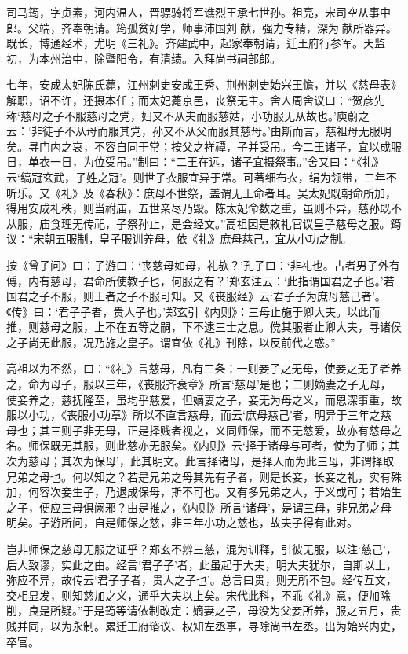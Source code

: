 \documentclass[12pt,UTF8]{ctexbook}
\begin{document}
司马筠，字贞素，河内温人，晋骠骑将军谯烈王承七世孙。祖亮，宋司空从事中郎。父端，齐奉朝请。筠孤贫好学，师事沛国刘献，强力专精，深为献所器异。既长，博通经术，尤明《三礼》。齐建武中，起家奉朝请，迁王府行参军。天监初，为本州治中，除暨阳令，有清绩。入拜尚书祠部郎。

七年，安成太妃陈氏薨，江州刺史安成王秀、荆州刺史始兴王憺，并以《慈母表》解职，诏不许，还摄本任；而太妃薨京邑，丧祭无主。舍人周舍议曰：“贺彦先称‘慈母之子不服慈母之党，妇又不从夫而服慈姑，小功服无从故也。’庾蔚之云：‘非徒子不从母而服其党，孙又不从父而服其慈母。’由斯而言，慈祖母无服明矣。寻门内之哀，不容自同于常；按父之祥禫，子并受吊。今二王诸子，宜以成服日，单衣一日，为位受吊。”制曰：“二王在远，诸子宜摄祭事。”舍又曰：“《礼》云‘缟冠玄武，子姓之冠’。则世子衣服宜异于常。可著细布衣，绢为领带，三年不听乐。又《礼》及《春秋》：庶母不世祭，盖谓无王命者耳。吴太妃既朝命所加，得用安成礼秩，则当祔庙，五世亲尽乃毁。陈太妃命数之重，虽则不异，慈孙既不从服，庙食理无传祀，子祭孙止，是会经文。”高祖因是敕礼官议皇子慈母之服。筠议：“宋朝五服制，皇子服训养母，依《礼》庶母慈己，宜从小功之制。

按《曾子问》曰：子游曰：‘丧慈母如母，礼欤？’孔子曰：‘非礼也。古者男子外有傅，内有慈母，君命所使教子也，何服之有？’郑玄注云：‘此指谓国君之子也。’若国君之子不服，则王者之子不服可知。又《丧服经》云‘君子子为庶母慈己者’。《传》曰：‘君子子者，贵人子也。’郑玄引《内则》：三母止施于卿大夫。以此而推，则慈母之服，上不在五等之嗣，下不逮三士之息。傥其服者止卿大夫，寻诸侯之子尚无此服，况乃施之皇子。谓宜依《礼》刊除，以反前代之惑。”

高祖以为不然，曰：“《礼》言慈母，凡有三条：一则妾子之无母，使妾之无子者养之，命为母子，服以三年，《丧服齐衰章》所言‘慈母’是也；二则嫡妻之子无母，使妾养之，慈抚隆至，虽均乎慈爱，但嫡妻之子，妾无为母之义，而恩深事重，故服以小功，《丧服小功章》所以不直言慈母，而云‘庶母慈己’者，明异于三年之慈母也；其三则子非无母，正是择贱者视之，义同师保，而不无慈爱，故亦有慈母之名。师保既无其服，则此慈亦无服矣。《内则》云‘择于诸母与可者，使为子师；其次为慈母；其次为保母’，此其明文。此言择诸母，是择人而为此三母，非谓择取兄弟之母也。何以知之？若是兄弟之母其先有子者，则是长妾，长妾之礼，实有殊加，何容次妾生子，乃退成保母，斯不可也。又有多兄弟之人，于义或可；若始生之子，便应三母俱阙邪？由是推之，《内则》所言‘诸母’，是谓三母，非兄弟之母明矣。子游所问，自是师保之慈，非三年小功之慈也，故夫子得有此对。

岂非师保之慈母无服之证乎？郑玄不辨三慈，混为训释，引彼无服，以注‘慈己’，后人致谬，实此之由。经言‘君子子’者，此虽起于大夫，明大夫犹尔，自斯以上，弥应不异，故传云‘君子子者，贵人之子也’。总言曰贵，则无所不包。经传互文，交相显发，则知慈加之义，通乎大夫以上矣。宋代此科，不乖《礼》意，便加除削，良是所疑。”于是筠等请依制改定：嫡妻之子，母没为父妾所养，服之五月，贵贱并同，以为永制。累迁王府谘议、权知左丞事，寻除尚书左丞。出为始兴内史，卒官。
\end{document}
